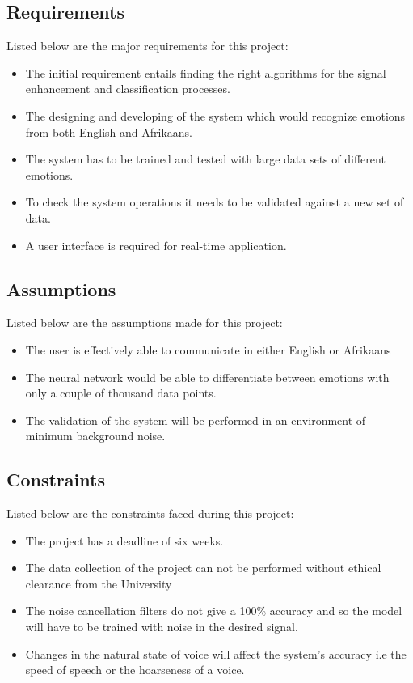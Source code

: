 \documentclass[10pt,twocolumn]{witseiepaper}
\begin{document}
\subsection{Requirements}
Listed below are the major requirements for this project: 
\begin{itemize}
	\item The initial requirement entails finding the right algorithms for the signal enhancement and classification processes. 
	\item The designing and developing of the system which would recognize emotions from both English and Afrikaans.
	\item The system has to be trained and tested with large data sets of different emotions.
	\item To check the system operations it needs to be validated against a new set of data.
	\item A user interface is required for real-time application. 
\end{itemize}  

\subsection{Assumptions}
Listed below are the assumptions made for this project: 
\begin{itemize}
	\item The user is effectively able to communicate in either English or Afrikaans 
	\item The neural network would be able to differentiate between emotions with only a couple of thousand data points.
	\item The validation of the system will be performed in an environment of minimum background noise.
\end{itemize}  
\subsection{Constraints}
Listed below are the constraints faced during this project: 
\begin{itemize}
	\item The project has a deadline of six weeks.
	\item The data collection of the project can not be performed without ethical clearance from the University
	\item The noise cancellation filters do not give a 100\% accuracy and so the model will have to be trained with noise in the desired signal. 
	\item Changes in the natural state of voice will affect the system's accuracy i.e the speed of speech or the hoarseness of a voice.
\end{itemize}  
\end{document}
